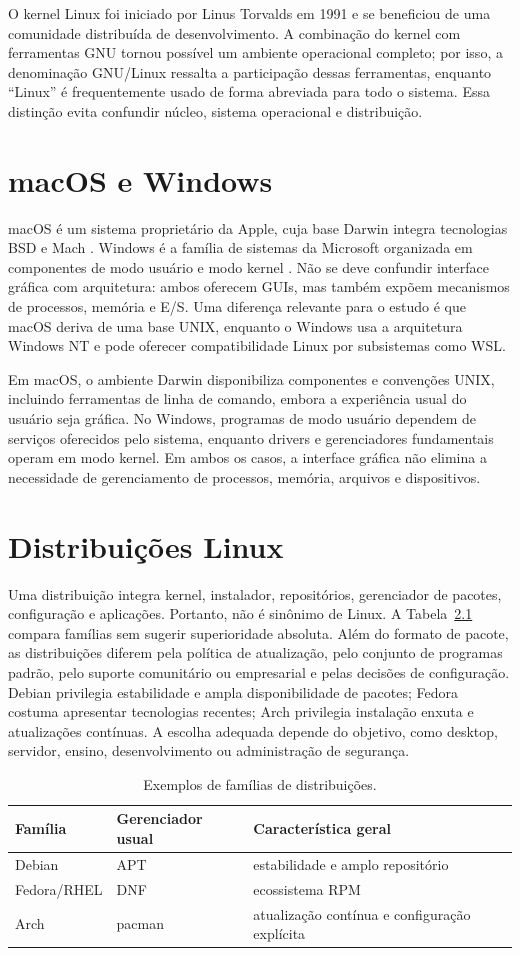 \documentclass[12pt,openright,oneside,a4paper,brazil]{abntex2}
\begin{document}
O kernel Linux foi iniciado por Linus Torvalds em 1991 e se beneficiou de uma comunidade distribuída de desenvolvimento. A combinação do kernel com ferramentas GNU tornou possível um ambiente operacional completo; por isso, a denominação GNU/Linux ressalta a participação dessas ferramentas, enquanto ``Linux'' é frequentemente usado de forma abreviada para todo o sistema. Essa distinção evita confundir núcleo, sistema operacional e distribuição.

\chapter{macOS e Windows}
macOS é um sistema proprietário da Apple, cuja base Darwin integra tecnologias BSD e Mach \cite{applekernel}. Windows é a família de sistemas da Microsoft organizada em componentes de modo usuário e modo kernel \cite{windowscomponents}. Não se deve confundir interface gráfica com arquitetura: ambos oferecem GUIs, mas também expõem mecanismos de processos, memória e E/S. Uma diferença relevante para o estudo é que macOS deriva de uma base UNIX, enquanto o Windows usa a arquitetura Windows NT e pode oferecer compatibilidade Linux por subsistemas como WSL.

Em macOS, o ambiente Darwin disponibiliza componentes e convenções UNIX, incluindo ferramentas de linha de comando, embora a experiência usual do usuário seja gráfica. No Windows, programas de modo usuário dependem de serviços oferecidos pelo sistema, enquanto drivers e gerenciadores fundamentais operam em modo kernel. Em ambos os casos, a interface gráfica não elimina a necessidade de gerenciamento de processos, memória, arquivos e dispositivos.

\chapter{Distribuições Linux}
Uma distribuição integra kernel, instalador, repositórios, gerenciador de pacotes, configuração e aplicações. Portanto, não é sinônimo de Linux. A Tabela~\ref{tab:distros} compara famílias sem sugerir superioridade absoluta.
Além do formato de pacote, as distribuições diferem pela política de atualização, pelo conjunto de programas padrão, pelo suporte comunitário ou empresarial e pelas decisões de configuração. Debian privilegia estabilidade e ampla disponibilidade de pacotes; Fedora costuma apresentar tecnologias recentes; Arch privilegia instalação enxuta e atualizações contínuas. A escolha adequada depende do objetivo, como desktop, servidor, ensino, desenvolvimento ou administração de segurança.
\begin{table}[htbp]\centering
\caption{Exemplos de famílias de distribuições.}\label{tab:distros}
\begin{tabular}{lll}\toprule
Família & Gerenciador usual & Característica geral\\\midrule
Debian & APT & estabilidade e amplo repositório\\
Fedora/RHEL & DNF & ecossistema RPM\\
Arch & pacman & atualização contínua e configuração explícita\\\bottomrule
\end{tabular}
\end{table}
\end{document}
